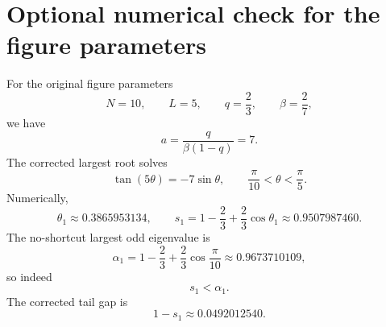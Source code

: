 \documentclass[11pt]{article}
\begin{document}
\section{Optional numerical check for the figure parameters}

For the original figure parameters
\begin{equation}
  N=10,
  \qquad L=5,
  \qquad q=\frac23,
  \qquad \beta=\frac27,
\end{equation}
we have
\begin{equation}
  a=\frac{q}{\beta(1-q)}=7.
\end{equation}
The corrected largest root solves
\begin{equation}
  \tan(5\theta)=-7\sin\theta,
  \qquad \frac{\pi}{10}<\theta<\frac{\pi}{5}.
\end{equation}
Numerically,
\begin{equation}
  \theta_1\approx0.3865953134,
  \qquad
  s_1=1-\frac23+\frac23\cos\theta_1\approx0.9507987460.
\end{equation}
The no-shortcut largest odd eigenvalue is
\begin{equation}
  \alpha_1=1-\frac23+\frac23\cos\frac{\pi}{10}\approx0.9673710109,
\end{equation}
so indeed
\begin{equation}
  s_1<\alpha_1.
\end{equation}
The corrected tail gap is
\begin{equation}
  1-s_1\approx0.0492012540.
\end{equation}
\end{document}

